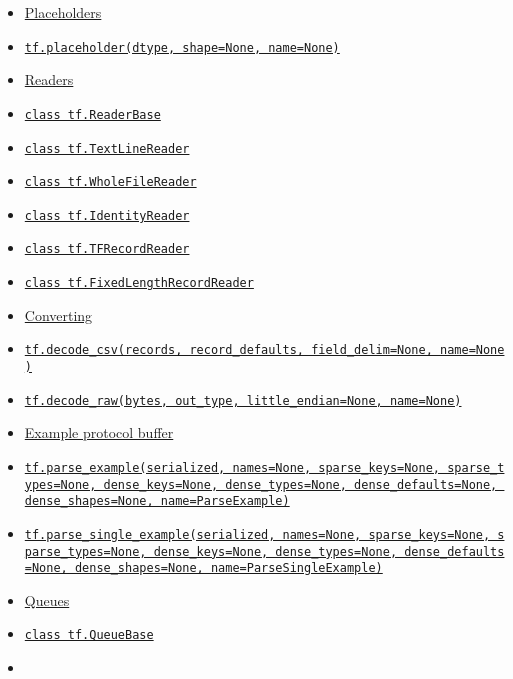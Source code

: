 \begin{itemize}
\tightlist
\item
  \protect\hyperlink{AUTOGENERATED-placeholders}{Placeholders}
\item
  \protect\hyperlink{placeholder}{\texttt{tf.placeholder(dtype,\ shape=None,\ name=None)}}
\item
  \protect\hyperlink{AUTOGENERATED-readers}{Readers}
\item
  \protect\hyperlink{ReaderBase}{\texttt{class\ tf.ReaderBase}}
\item
  \protect\hyperlink{TextLineReader}{\texttt{class\ tf.TextLineReader}}
\item
  \protect\hyperlink{WholeFileReader}{\texttt{class\ tf.WholeFileReader}}
\item
  \protect\hyperlink{IdentityReader}{\texttt{class\ tf.IdentityReader}}
\item
  \protect\hyperlink{TFRecordReader}{\texttt{class\ tf.TFRecordReader}}
\item
  \protect\hyperlink{FixedLengthRecordReader}{\texttt{class\ tf.FixedLengthRecordReader}}
\item
  \protect\hyperlink{AUTOGENERATED-converting}{Converting}
\item
  \protect\hyperlink{decodeux5fcsv}{\texttt{tf.decode\_csv(records,\ record\_defaults,\ field\_delim=None,\ name=None)}}
\item
  \protect\hyperlink{decodeux5fraw}{\texttt{tf.decode\_raw(bytes,\ out\_type,\ little\_endian=None,\ name=None)}}
\item
  \protect\hyperlink{AUTOGENERATED-example-protocol-buffer}{Example
  protocol buffer}
\item
  \protect\hyperlink{parseux5fexample}{\texttt{tf.parse\_example(serialized,\ names=None,\ sparse\_keys=None,\ sparse\_types=None,\ dense\_keys=None,\ dense\_types=None,\ dense\_defaults=None,\ dense\_shapes=None,\ name=\textquotesingle{}ParseExample\textquotesingle{})}}
\item
  \protect\hyperlink{parseux5fsingleux5fexample}{\texttt{tf.parse\_single\_example(serialized,\ names=None,\ sparse\_keys=None,\ sparse\_types=None,\ dense\_keys=None,\ dense\_types=None,\ dense\_defaults=None,\ dense\_shapes=None,\ name=\textquotesingle{}ParseSingleExample\textquotesingle{})}}
\item
  \protect\hyperlink{AUTOGENERATED-queues}{Queues}
\item
  \protect\hyperlink{QueueBase}{\texttt{class\ tf.QueueBase}}
\item

\end{itemize}
